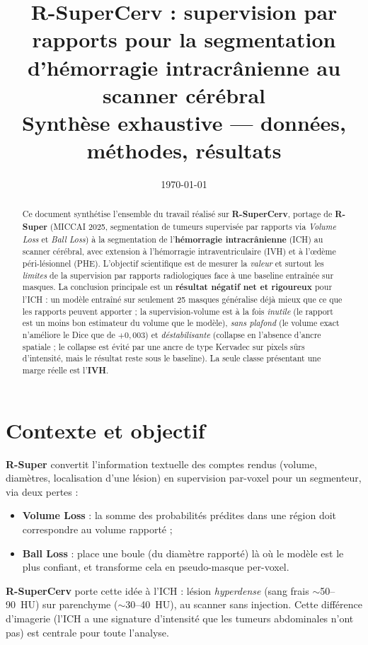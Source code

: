 \documentclass[11pt,a4paper]{article}
\title{\textbf{R-SuperCerv : supervision par rapports pour la segmentation\\
d'hémorragie intracrânienne au scanner cérébral\\[4pt]
\large Synthèse exhaustive --- données, méthodes, résultats}}
\author{}
\date{\today}
\begin{document}
\maketitle

\begin{abstract}
\noindent Ce document synthétise l'ensemble du travail réalisé sur \textbf{R-SuperCerv},
portage de \textbf{R-Super} (MICCAI 2025, segmentation de tumeurs supervisée par rapports
via \emph{Volume Loss} et \emph{Ball Loss}) à la segmentation de l'\textbf{hémorragie
intracrânienne} (ICH) au scanner cérébral, avec extension à l'hémorragie intraventriculaire
(IVH) et à l'\oe dème péri-lésionnel (PHE). L'objectif scientifique est de mesurer la
\emph{valeur} et surtout les \emph{limites} de la supervision par rapports radiologiques
face à une baseline entraînée sur masques. La conclusion principale est un \textbf{résultat
négatif net et rigoureux} pour l'ICH : un modèle entraîné sur seulement 25 masques généralise
déjà mieux que ce que les rapports peuvent apporter ; la supervision-volume est à la fois
\emph{inutile} (le rapport est un moins bon estimateur du volume que le modèle),
\emph{sans plafond} (le volume exact n'améliore le Dice que de $+0{,}003$) et
\emph{déstabilisante} (collapse en l'absence d'ancre spatiale ; le collapse est évité par
une ancre de type Kervadec sur pixels sûrs d'intensité, mais le résultat reste sous le
baseline). La seule classe présentant une marge réelle est l'\textbf{IVH}.
\end{abstract}

\tableofcontents

\section{Contexte et objectif}
\textbf{R-Super} convertit l'information textuelle des comptes rendus (volume, diamètres,
localisation d'une lésion) en supervision par-voxel pour un segmenteur, via deux pertes :
\begin{itemize}[nosep]
  \item \textbf{Volume Loss} : la somme des probabilités prédites dans une région doit
  correspondre au volume rapporté ;
  \item \textbf{Ball Loss} : place une boule (du diamètre rapporté) là où le modèle est le
  plus confiant, et transforme cela en pseudo-masque per-voxel.
\end{itemize}
\textbf{R-SuperCerv} porte cette idée à l'ICH : lésion \emph{hyperdense} (sang frais
$\sim$50--90~HU) sur parenchyme ($\sim$30--40~HU), au scanner sans injection. Cette
différence d'imagerie (l'ICH a une signature d'intensité que les tumeurs abdominales
n'ont pas) est centrale pour toute l'analyse.
\end{document}
